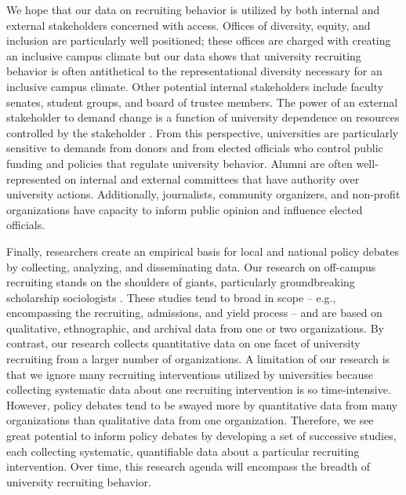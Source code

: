 \documentclass[twoside]{article}
\begin{document}
We hope that our data on recruiting behavior is utilized by both internal and external stakeholders concerned with access.  Offices of diversity, equity, and inclusion are particularly well positioned; these offices are charged with creating an inclusive campus climate but our data shows that university recruiting behavior is often antithetical to the representational diversity necessary for an inclusive campus climate.  Other potential internal stakeholders include faculty senates, student groups, and board of trustee members.  The power of an external stakeholder to demand change is a function of university dependence on resources controlled by the stakeholder \citep{RN959}. From this perspective, universities are particularly sensitive to demands from donors and from elected officials who control public funding and policies that regulate university behavior.  Alumni are often well-represented on internal and external committees that have authority over university actions.  Additionally, journalists, community organizers, and non-profit organizations have capacity to inform public opinion and influence elected officials.

Finally, researchers create an empirical basis for local and national policy debates by collecting, analyzing, and disseminating data.  Our research on off-campus recruiting stands on the shoulders of giants, particularly groundbreaking scholarship sociologists \citep[e.g., ][]{RN3519,RN4407,RN4324}. These studies tend to broad in scope -- e.g., encompassing the recruiting, admissions, and yield process -- and are based on qualitative, ethnographic, and archival data from one or two organizations. By contrast, our research collects quantitative data on one facet of university recruiting from a larger number of organizations. A limitation of our research is that we ignore many recruiting interventions utilized by universities because collecting systematic data about one recruiting intervention is so time-intensive. However, policy debates tend to be swayed more by quantitative data from many organizations than qualitative data from one organization. Therefore, we see great potential to inform policy debates by developing a set of successive studies, each collecting systematic, quantifiable data about a particular recruiting intervention. Over time, this research agenda will encompass the breadth of university recruiting behavior.  
\end{document}

